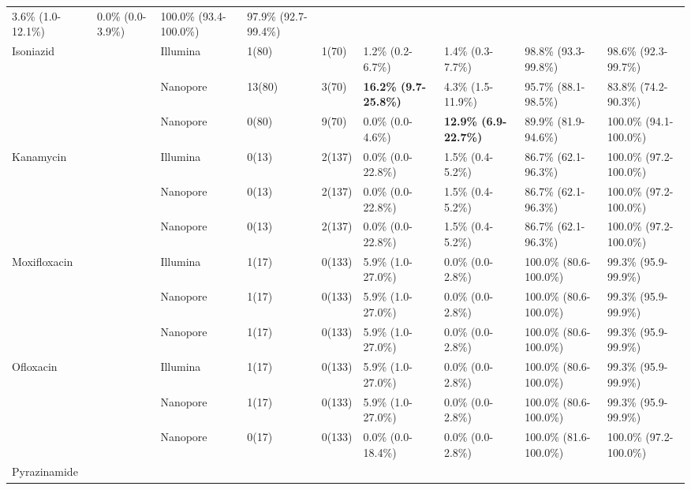 \begin{table}
{\begin{tabular}{lllllllll}
  3.6\% (1.0-12.1\%) &
  0.0\% (0.0-3.9\%) &
  100.0\% (93.4-100.0\%) &
  97.9\% (92.7-99.4\%) \\ \cline{2-9} 
\multirow{3}{*}{Isoniazid} &
  \drprg{} &
  Illumina &
  1(80) &
  1(70) &
  1.2\% (0.2-6.7\%) &
  1.4\% (0.3-7.7\%) &
  98.8\% (93.3-99.8\%) &
  98.6\% (92.3-99.7\%) \\
 &
  \drprg{} &
  Nanopore &
  13(80) &
  3(70) &
  \textbf{16.2\% (9.7-25.8\%)} &
  4.3\% (1.5-11.9\%) &
  95.7\% (88.1-98.5\%) &
  83.8\% (74.2-90.3\%) \\
 &
  \mykrobe{} &
  Nanopore &
  0(80) &
  9(70) &
  0.0\% (0.0-4.6\%) &
  \textbf{12.9\% (6.9-22.7\%)} &
  89.9\% (81.9-94.6\%) &
  100.0\% (94.1-100.0\%) \\ \cline{2-9} 
\multirow{3}{*}{Kanamycin} &
  \drprg{} &
  Illumina &
  0(13) &
  2(137) &
  0.0\% (0.0-22.8\%) &
  1.5\% (0.4-5.2\%) &
  86.7\% (62.1-96.3\%) &
  100.0\% (97.2-100.0\%) \\
 &
  \drprg{} &
  Nanopore &
  0(13) &
  2(137) &
  0.0\% (0.0-22.8\%) &
  1.5\% (0.4-5.2\%) &
  86.7\% (62.1-96.3\%) &
  100.0\% (97.2-100.0\%) \\
 &
  \mykrobe{} &
  Nanopore &
  0(13) &
  2(137) &
  0.0\% (0.0-22.8\%) &
  1.5\% (0.4-5.2\%) &
  86.7\% (62.1-96.3\%) &
  100.0\% (97.2-100.0\%) \\ \cline{2-9} 
\multirow{3}{*}{Moxifloxacin} &
  \drprg{} &
  Illumina &
  1(17) &
  0(133) &
  5.9\% (1.0-27.0\%) &
  0.0\% (0.0-2.8\%) &
  100.0\% (80.6-100.0\%) &
  99.3\% (95.9-99.9\%) \\
 &
  \drprg{} &
  Nanopore &
  1(17) &
  0(133) &
  5.9\% (1.0-27.0\%) &
  0.0\% (0.0-2.8\%) &
  100.0\% (80.6-100.0\%) &
  99.3\% (95.9-99.9\%) \\
 &
  \mykrobe{} &
  Nanopore &
  1(17) &
  0(133) &
  5.9\% (1.0-27.0\%) &
  0.0\% (0.0-2.8\%) &
  100.0\% (80.6-100.0\%) &
  99.3\% (95.9-99.9\%) \\ \cline{2-9} 
\multirow{3}{*}{Ofloxacin} &
  \drprg{} &
  Illumina &
  1(17) &
  0(133) &
  5.9\% (1.0-27.0\%) &
  0.0\% (0.0-2.8\%) &
  100.0\% (80.6-100.0\%) &
  99.3\% (95.9-99.9\%) \\
 &
  \drprg{} &
  Nanopore &
  1(17) &
  0(133) &
  5.9\% (1.0-27.0\%) &
  0.0\% (0.0-2.8\%) &
  100.0\% (80.6-100.0\%) &
  99.3\% (95.9-99.9\%) \\
 &
  \mykrobe{} &
  Nanopore &
  0(17) &
  0(133) &
  0.0\% (0.0-18.4\%) &
  0.0\% (0.0-2.8\%) &
  100.0\% (81.6-100.0\%) &
  100.0\% (97.2-100.0\%) \\ \cline{2-9} 
\multirow{3}{*}{Pyrazinamide} &

\end{tabular}}
\end{table}
